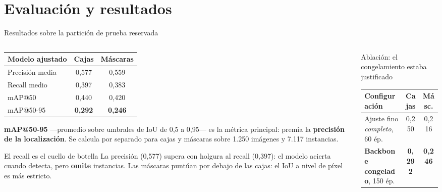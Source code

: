 \documentclass[aspectratio=169,11pt]{beamer}
\begin{document}
\section{Evaluación y resultados}

\begin{frame}{Resultados sobre la partición de prueba reservada}
  \begin{columns}[T]
    \begin{column}{0.53\textwidth}
      \centering
      {\small
      \begin{tabular}{@{}lcc@{}}
        \toprule
        \textbf{Modelo ajustado} & \textbf{Cajas} & \textbf{Máscaras} \\
        \midrule
        Precisión media & 0,577 & 0,559 \\
        Recall medio    & 0,397 & 0,383 \\
        mAP@50          & 0,440 & 0,420 \\
        mAP@50-95       & \textbf{0,292} & \textbf{0,246} \\
        \bottomrule
      \end{tabular}}

      \vspace{0.4em}
      \raggedright
      {\scriptsize \textbf{mAP@50-95} ---promedio sobre umbrales de IoU de 0,5 a 0,95--- es
      la métrica principal: premia la \textbf{precisión de la localización}. Se calcula por
      separado para cajas y máscaras sobre 1.250 imágenes y 7.117 instancias.}

      \vspace{0.4em}
      \begin{block}{El recall es el cuello de botella}
        \scriptsize
        La precisión (0,577) supera con holgura al recall (0,397): el modelo acierta cuando
        detecta, pero \textbf{omite} instancias. Las máscaras puntúan por debajo de las
        cajas: el IoU a nivel de píxel es más estricto.
      \end{block}
    \end{column}
    \begin{column}{0.45\textwidth}
      \begin{exampleblock}{Ablación: el congelamiento estaba justificado}
        \scriptsize
        \centering
        \begin{tabular}{@{}lcc@{}}
          \toprule
          \textbf{Configuración} & \textbf{Cajas} & \textbf{Másc.} \\
          \midrule
          Ajuste fino \emph{completo}, 60 ép. & 0,250 & 0,216 \\
          \textbf{Backbone congelado}, 150 ép. & \textbf{0,292} & \textbf{0,246} \\
          \bottomrule
        \end{tabular}


\end{exampleblock}
\end{column}
\end{columns}
\end{frame}
\end{document}
